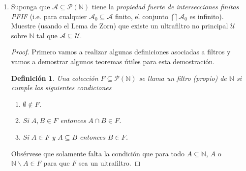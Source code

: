\documentclass[letter,twoside,12pt]{article}
\newtheorem*{defi}{Definición}
\begin{document}
\begin{enumerate}
\begin{proof}
Además, $ \tau^{\circ} $ no tiene puntos aislados, porque si los tuviera entonces existiria algun $ x \in X $ tal que $ \{x\} \in \tau^\circ $, pero entonces como es la generada por $ \mathcal{B} $ debe existir algún $ B \in \mathcal{B} $ tal que $ x \in B \subseteq \mathcal{B} $, pero entonces $ B = \{x\}$. Luego existiria algún $ \tau \in T $ tal que $ \{x\} \in \tau $. Llegamos a una contradicción pues $ \tau \in P $ y por lo tanto no puede tener puntos aislados.

Por lo tanto, las condiciones del Lema de Zorn se cumplen y al aplicarlo obtenemos la existencia de una topología $ \tau^* $ máximal. Esta topología cumple las condiciones requeridas. Las primeras dos porque $ \tau^* \in P $ y la tercera porque es máximal. Faltaria demostrar que $ \tau^* $ es de Hausdorff pero esto se sigue pues cualquier topología que contenga a una topología de Hausdorff es de Hausdorff.
\end{proof}

\item Suponga que $ \mathcal{A} \subseteq \mathcal{P}(\mathbb{N}) $ tiene la \textit{propiedad fuerte de intersecciones finitas PFIF} (i.e. para cualquier $ \mathcal{A}_0 \subseteq \mathcal{A} $ finito, el conjunto $ \bigcap \mathcal{A}_0 $ es infinito). Muestre (usando el Lema de Zorn) que existe un ultrafiltro no principal $ \mathcal{U} $ sobre $ \mathbb{N} $ tal que $ \mathcal{A} \subseteq \mathcal{U} $. 

\begin{proof}

Primero vamos a realizar algunas definiciones asociadas a filtros y vamos a demostrar algunos teoremas útiles para esta demostración.

\begin{defi}
Una colección $ F \subseteq \mathcal{P}(\mathbb{N}) $ se llama un filtro (propio) de $ \mathbb{N} $ si cumple las siguientes condiciones
\begin{enumerate}
\item $ \emptyset \not \in F $.
\item Si $ A,B \in F $ entonces $ A \cap B \in F $.
\item Si $ A \in F $ y $ A \subseteq B $ entonces $ B \in F $.
\end{enumerate}  
\end{defi}
Obsérvese que solamente falta la condición que para todo $ A \subseteq \mathbb{N} $, $ A $ o $ \mathbb{N} \backslash A \in F$ para que $ F $ sea un ultrafiltro.


\end{proof}
\end{enumerate}
\end{document}
